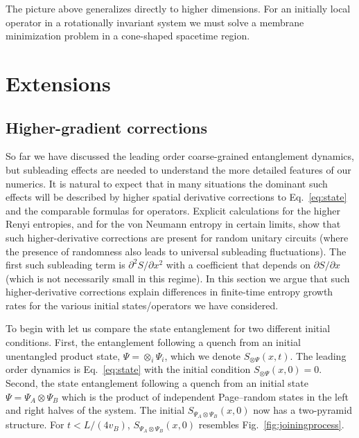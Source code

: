 \documentclass[aps,prx,twocolumn,superscriptaddress,floatfix,nofootinbib,prx]{revtex4}
\renewcommand{\>}{\right\rangle}
\newcommand{\<}{\left\langle}
\begin{document}
The picture above generalizes directly to higher dimensions. For an initially local operator in a  rotationally invariant system we must solve a membrane minimization problem in a cone-shaped spacetime region.


\section{Extensions}



\subsection{Higher-gradient corrections}
\label{higher_gradient}



So far we have discussed the leading order coarse-grained entanglement dynamics, 
but subleading effects are needed to understand the more detailed features of our numerics.  It is natural to expect that in many situations the dominant such effects will be described by higher spatial derivative corrections to Eq.~\ref{eq:state} and the comparable formulas for operators.  Explicit calculations  for the higher Renyi entropies, and for the von Neumann entropy in certain limits, show that such higher-derivative corrections are present for random unitary circuits (where the presence of randomness also leads to universal subleading fluctuations).\cite{nahum,zhounahum} 
The first such subleading term is $\partial^2 S/\partial x^2$ with a coefficient that depends on $\partial S/\partial x$ (which is not necessarily small in this regime).  In this section we argue that such higher-derivative corrections explain differences in finite-time entropy growth rates for the various initial states/operators we have considered.

To begin with let us  compare the state entanglement for two different initial conditions.  First, the entanglement following a quench from an initial unentangled product state, $\Psi = \otimes_i \Psi_i$, which we denote  $S_{\otimes \Psi}(x,t)$.   The leading order dynamics is Eq.~\ref{eq:state} with the initial condition ${S_{\otimes \Psi}(x,0) = 0}$.  Second, the state entanglement following a quench from an initial state $\Psi= \Psi_A\otimes \Psi_B$ which is the product of independent Page--random states in the left and right halves of the system.  The initial ${S_{\Psi_A\otimes\Psi_B}(x,0)}$ now has a two-pyramid structure.  For $t< L/(4 v_B)$,  ${S_{\Psi_A\otimes\Psi_B}(x,0)}$ resembles Fig.~\ref{fig:joiningprocess}.
\end{document}
